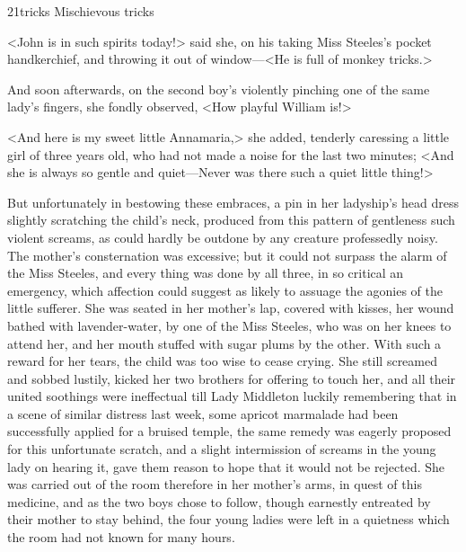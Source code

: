 
\begin{bwbigpic}
	[1.0]
	{21tricks} 
	{Mischievous tricks} 
\end{bwbigpic}

<John is in such spirits today!> said she, on his taking Miss Steeles's pocket handkerchief, and throwing it out of window—<He is full of monkey tricks.>

And soon afterwards, on the second boy's violently pinching one of the same lady's fingers, she fondly observed, <How playful William is!>

<And here is my sweet little Annamaria,> she added, tenderly caressing a little girl of three years old, who had not made a noise for the last two minutes; <And she is always so gentle and quiet—Never was there such a quiet little thing!>

But unfortunately in bestowing these embraces, a pin in her ladyship's head dress slightly scratching the child's neck, produced from this pattern of gentleness such violent screams, as could hardly be outdone by any creature professedly noisy. The mother's consternation was excessive; but it could not surpass the alarm of the Miss Steeles, and every thing was done by all three, in so critical an emergency, which affection could suggest as likely to assuage the agonies of the little sufferer. She was seated in her mother's lap, covered with kisses, her wound bathed with lavender-water, by one of the Miss Steeles, who was on her knees to attend her, and her mouth stuffed with sugar plums by the other. With such a reward for her tears, the child was too wise to cease crying. She still screamed and sobbed lustily, kicked her two brothers for offering to touch her, and all their united soothings were ineffectual till Lady Middleton luckily remembering that in a scene of similar distress last week, some apricot marmalade had been successfully applied for a bruised temple, the same remedy was eagerly proposed for this unfortunate scratch, and a slight intermission of screams in the young lady on hearing it, gave them reason to hope that it would not be rejected. She was carried out of the room therefore in her mother's arms, in quest of this medicine, and as the two boys chose to follow, though earnestly entreated by their mother to stay behind, the four young ladies were left in a quietness which the room had not known for many hours.

